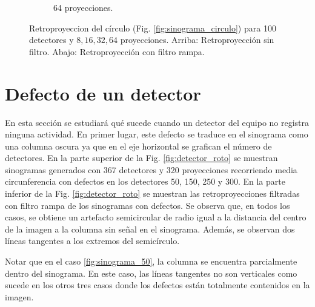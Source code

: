 \documentclass[letterpaper,12pt]{article}
\theoremstyle{plain}
\begin{document}
\begin{figure}[H]
\begin{subfigure}[h]{0.24\textwidth}
           \caption{64 proyecciones.} 
        \end{subfigure}
   \caption{Retroproyeccion del círculo (Fig. \ref{fig:sinograma_circulo}) para 100 detectores y $8,16,32,64$ proyecciones. Arriba: Retroproyección sin filtro. Abajo: Retroproyección con filtro rampa.}
   \label{fig:retroproyeccion_circulo}
\end{figure}

\section{Defecto de un detector}

En esta sección se estudiará qué sucede cuando un detector del equipo no registra ninguna actividad. En primer lugar, este defecto se traduce en el sinograma como una columna oscura ya que en el eje horizontal se grafican el número de detectores. En la parte superior de la Fig. \ref{fig:detector_roto} se muestran sinogramas generados con 367 detectores y 320 proyecciones recorriendo media circunferencia con defectos en los detectores 50, 150, 250 y 300. En la parte inferior de la Fig. \ref{fig:detector_roto} se muestran las retroproyecciones filtradas con filtro rampa de los sinogramas con defectos. Se observa que, en todos los casos, se obtiene un artefacto semicircular de radio igual a la distancia del centro de la imagen a la columna sin señal en el sinograma. Además, se observan dos líneas tangentes a los extremos del semicírculo. 

Notar que en el caso \ref{fig:sinograma_50}, la columna se encuentra parcialmente dentro del sinograma. En este caso, las líneas tangentes no son verticales como sucede en los otros tres casos donde los defectos están totalmente contenidos en la imagen. 
\end{document}
